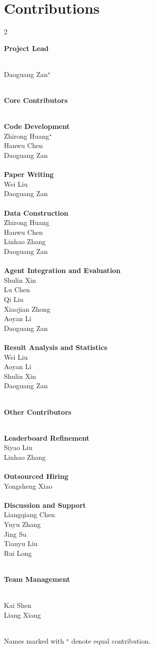 \documentclass[11pt, a4paper, logo, copyright, nonumbering]{seed}
\newcommand{\creditsectionheader}[1]{\parbox{\columnwidth}{\centering \textbf{\large #1}}\\}
\newcommand{\corecontributor}[1]{#1\\}
\begin{document}
\clearpage
\newpage

\section*{Contributions}
\label{sec:contributions}

\setlength{\parindent}{0em}
\begin{multicols}{2}
\small
\creditsectionheader{Project Lead}
\corecontributor{Daoguang Zan$^\star$}
\\
\creditsectionheader{Core Contributors}
\textbf{Code Development}\\
\corecontributor{Zhirong Huang$^\star$}
\corecontributor{Hanwu Chen}
\corecontributor{Daoguang Zan}
\\
\textbf{Paper Writing}\\
\corecontributor{Wei Liu}
\corecontributor{Daoguang Zan}
\\
\textbf{Data Construction}\\
\corecontributor{Zhirong Huang}
\corecontributor{Hanwu Chen}
\corecontributor{Linhao Zhang}
\corecontributor{Daoguang Zan}
\\
\textbf{Agent Integration and Evaluation}\\
\corecontributor{Shulin Xin}
\corecontributor{Lu Chen}
\corecontributor{Qi Liu}
\corecontributor{Xiaojian Zhong}
\corecontributor{Aoyan Li}
\corecontributor{Daoguang Zan}
\\
\textbf{Result Analysis and Statistics}\\
\corecontributor{Wei Liu}
\corecontributor{Aoyan Li}
\corecontributor{Shulin Xin}
\corecontributor{Daoguang Zan}
\\
\creditsectionheader{Other Contributors}
\textbf{Leaderboard Refinement}\\
\corecontributor{Siyao Liu}
\corecontributor{Linhao Zhang}
\\
\textbf{Outsourced Hiring}\\
\corecontributor{Yongsheng Xiao}
\\
\textbf{Discussion and Support}\\
\corecontributor{Liangqiang Chen}
\corecontributor{Yuyu Zhang}
\corecontributor{Jing Su}
\corecontributor{Tianyu Liu}
\corecontributor{Rui Long}
\\
\creditsectionheader{Team Management}
\corecontributor{Kai Shen}
\corecontributor{Liang Xiang}
\\
\end{multicols}

Names marked with $^\star$ denote equal contribution.
\end{document}
